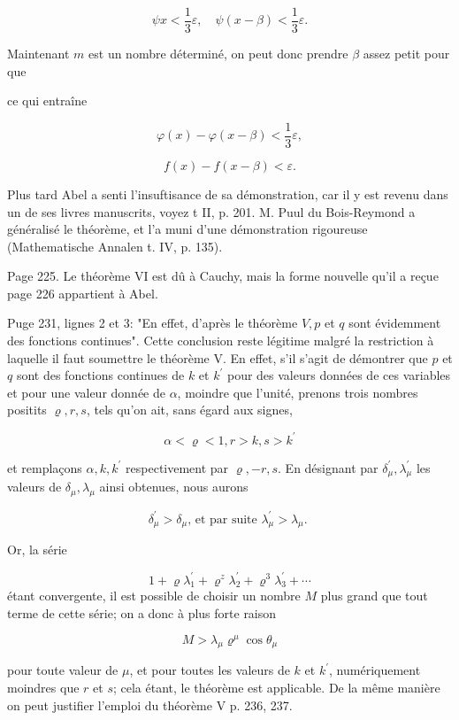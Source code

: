 \documentclass{article}
\begin{document}
\[
\psi x<\frac{1}{3} \varepsilon, \quad \psi(x-\beta)<\frac{1}{3} \varepsilon .
\]

Maintenant \(m\) est un nombre déterminé, on peut donc prendre \(\beta\) assez petit pour que

ce qui entraîne

\[
\varphi(x)-\varphi(x-\beta)<\frac{1}{3} \varepsilon,
\]

\[
f(x)-f(x-\beta)<\varepsilon .
\]

Plus tard Abel a senti l'insuftisance de sa démonstration, car il y est revenu dans un de ses livres manuscrits, voyez t II, p. 201. M. Puul du Bois-Reymond a généralisé le théorème, et l'a muni d'une démonstration rigoureuse (Mathematische Annalen t. IV, p. 135).

Page 225. Le théorème VI est dû à Cauchy, mais la forme nouvelle qu'il a reçue page 226 appartient à Abel.

Puge 231, lignes 2 et 3: "En effet, d'après le théorème \(V, p\) et \(q\) sont évidemment des fonctions continues". Cette conclusion reste légitime malgré la restriction à laquelle il faut soumettre le théorème V. En effet, s'il s'agit de démontrer que \(p\) et \(q\) sont des fonctions continues de \(k\) et \(k^{\prime}\) pour des valeurs données de ces variables et pour une valeur donnée de \(\alpha\), moindre que l'unité, prenons trois nombres positits \(\varrho, r, s\), tels qu'on ait, sans égard aux signes,

\[
\alpha<\varrho<1, r>k, s>k^{\prime}
\]

et remplaçons \(\alpha, k, k^{\prime}\) respectivement par \(\varrho,-r, s\). En désignant par \(\delta_{\mu}^{\prime}, \lambda_{\mu}^{\prime}\) les valeurs de \(\delta_{\mu}, \lambda_{\mu}\) ainsi obtenues, nous aurons

\[
\delta_{\mu}^{\prime}>\delta_{\mu} \text {, et par suite } \lambda_{\mu}^{\prime}>\lambda_{\mu} \text {. }
\]

Or, la série

\[
1+\varrho \lambda_{1}^{\prime}+\varrho^{z} \lambda_{2}^{\prime}+\varrho^{3} \lambda_{3}^{\prime}+\cdots
\]
étant convergente, il est possible de choisir un nombre \(M\) plus grand que tout terme de cette série; on a donc à plus forte raison

\[
M>\lambda_{\mu} \varrho^{\mu} \cos \theta_{\mu}
\]

pour toute valeur de \(\mu\), et pour toutes les valeurs de \(k\) et \(k^{\prime}\), numériquement moindres que \(r\) et \(s\); cela étant, le théorème est applicable. De la même manière on peut justifier l'emploi \(\mathrm{du}\) théorème \(\mathrm{V}\) p. 236, 237.
\end{document}
